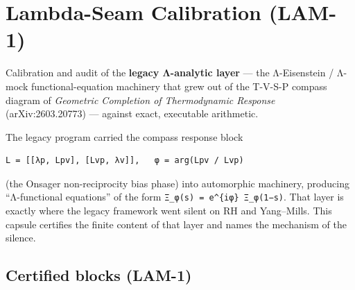\hypertarget{lambda-seam-calibration-lam-1}{%
\chapter{Lambda-Seam Calibration (LAM-1)}\label{lambda-seam-calibration-lam-1}}

Calibration and audit of the \textbf{legacy Λ-analytic layer} --- the
Λ-Eisenstein / Λ-mock functional-equation machinery that grew out of the
T-V-S-P compass diagram of \emph{Geometric Completion of Thermodynamic
Response} (arXiv:2603.20773) --- against exact, executable arithmetic.

The legacy program carried the compass response block

\begin{verbatim}
L = [[λp, Lpv], [Lvp, λv]],   φ = arg(Lpv / Lvp)
\end{verbatim}

(the Onsager non-reciprocity bias phase) into automorphic machinery,
producing ``Λ-functional equations'' of the form
\texttt{Ξ\_φ(s)\ =\ e\^{}\{iφ\}\ Ξ\_φ(1−s)}. That layer is exactly where the legacy
framework went silent on RH and Yang--Mills. This capsule certifies the
finite content of that layer and names the mechanism of the silence.

\hypertarget{certified-blocks-lam-1}{%
\section{Certified blocks (LAM-1)}\label{certified-blocks-lam-1}}


